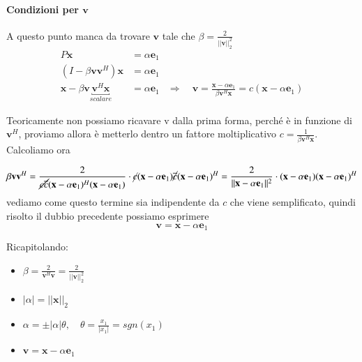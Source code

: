 \paragraph{Condizioni per $\mathbf{v}$}
A questo punto manca da trovare $\mathbf{v}$ tale che $\beta = \frac{2}{|| \mathbf{v} ||^2_2}$
\[\begin{array}{lll}
 P\mathbf{x} &= \alpha \mathbf{e}_1 \\
 (I - \beta \mathbf{v}\mathbf{v}^{H}) \mathbf{x} &= \alpha \mathbf{e}_1 \\
 \mathbf{x} - \beta \mathbf{v} \underbracket{\mathbf{v}^{H}\mathbf{x}}_{scalare} &= \alpha \mathbf{e}_1 &
 \Rightarrow \quad \mathbf{v} = \frac{\mathbf{x} - \alpha \mathbf{e}_1}{\beta \mathbf{v}^{H}\mathbf{x}} = c(\mathbf{x} - \alpha \mathbf{e}_1)
\end{array}\]

Teoricamente non possiamo ricavare v dalla prima forma, perch\'e \`e in
funzione di $\mathbf{v}^{H}$, proviamo allora \`e metterlo dentro un fattore
moltiplicativo $ c = \frac{1}{\beta \mathbf{v}^{H}\mathbf{x}}$. Calcoliamo ora 

$$ \beta \mathbf{v}\mathbf{v}^{H} = 
\frac{2}{\cancel{c \overline{c}} (\mathbf{x} - \alpha \mathbf{e}_1)^{H} (\mathbf{x} - \alpha \mathbf{e}_1)}
\cdot \cancel{c} (\mathbf{x} - \alpha \mathbf{e}_1) \cancel{\overline{c}} (\mathbf{x} - \alpha \mathbf{e}_1)^{H} =
\frac{2}{|| \mathbf{x} - \alpha \mathbf{e}_1||^{2}} \cdot (\mathbf{x} - \alpha \mathbf{e}_1) (\mathbf{x} - \alpha \mathbf{e}_1)^{H}$$
vediamo come questo termine sia indipendente da $c$ che viene semplificato,
quindi risolto il dubbio precedente possiamo esprimere
$$ \mathbf{v} = \mathbf{x} - \alpha \mathbf{e}_1 $$

Ricapitolando:
\begin{itemize}
 \item $ \beta = \frac{2}{\mathbf{v}^{H}\mathbf{v}} = \frac{2}{||\mathbf{v}||^{2}_{2}}$
 \item $|\alpha| = || \mathbf{x}||_{2}$
 \item $ \alpha = \pm |\alpha|\theta ,  \quad \theta = \frac{x_1}{|x_1|} = sgn(x_1)$
 \item $\mathbf{v} = \mathbf{x} - \alpha \mathbf{e}_1 $
\end{itemize}


